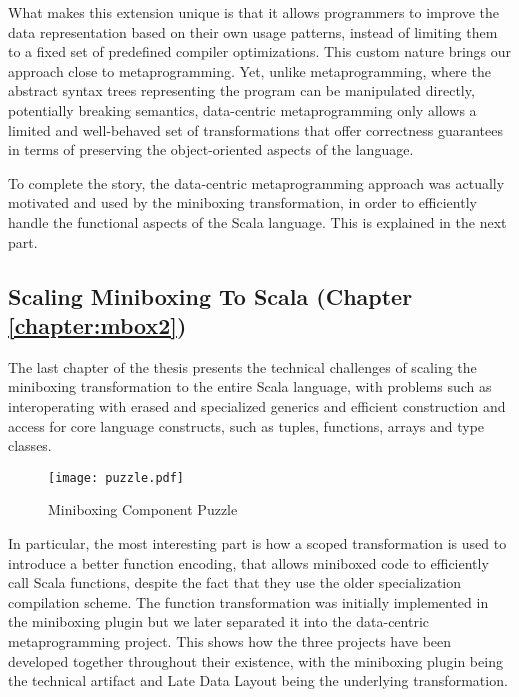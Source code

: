 What makes this extension unique is that it allows programmers to improve the data representation based on their own usage patterns, instead of limiting them to a fixed set of predefined compiler optimizations. This custom nature brings our approach close to metaprogramming. Yet, unlike metaprogramming, where the abstract syntax trees representing the program can be manipulated directly, potentially breaking semantics, data-centric metaprogramming only allows a limited and well-behaved set of transformations that offer correctness guarantees in terms of preserving the object-oriented aspects of the language.

To complete the story, the data-centric metaprogramming approach was actually motivated and used by the miniboxing transformation, in order to efficiently handle the functional aspects of the Scala language. This is explained in the next part.


\subsection{Scaling Miniboxing To Scala (Chapter \ref{chapter:mbox2})}

The last chapter of the thesis presents the technical challenges of scaling the miniboxing transformation to the entire Scala language, with problems such as interoperating with erased and specialized generics and efficient construction and access for core language constructs, such as tuples, functions, arrays and type classes.

\begin{wrapfigure}{r}{40mm}
  \centering
  \vspace{-2.5em}
  \texttt{[image: puzzle.pdf]}
  \caption{Miniboxing Component Puzzle}
  \vspace{-2em}
\end{wrapfigure}

In particular, the most interesting part is how a scoped transformation is used to introduce a better function encoding, that allows miniboxed code to efficiently call Scala functions, despite the fact that they use the older  specialization compilation scheme. The function transformation was initially implemented in the miniboxing plugin but we later separated it into the data-centric metaprogramming project. This shows how the three projects have been developed together throughout their existence, with the miniboxing plugin being the technical artifact and Late Data Layout being the underlying transformation.

